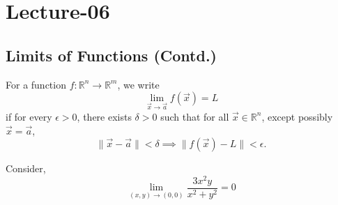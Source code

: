 \newpage
\section{Lecture-06}
\subsection{Limits of Functions (Contd.)}
\begin{definition}
	For a function $f:\mathbb R^n\rightarrow \mathbb R^m$, we write $$\lim_{\vec x\rightarrow \vec a}f(\vec x)=L$$
	if for every $\epsilon>0$, there exists $\delta>0$ such that for all $\vec x\in\mathbb R^n$, except possibly $\vec x=\vec a$,
	$$\|\vec x-\vec a\|<\delta \implies \|f(\vec x)-L\|<\epsilon.$$
\end{definition}
\begin{example}
	Consider,
	$$
		\lim_{(x,y)\rightarrow (0,0)}\frac{3x^2y}{x^2+y^2}=0
	$$
\end{example}

